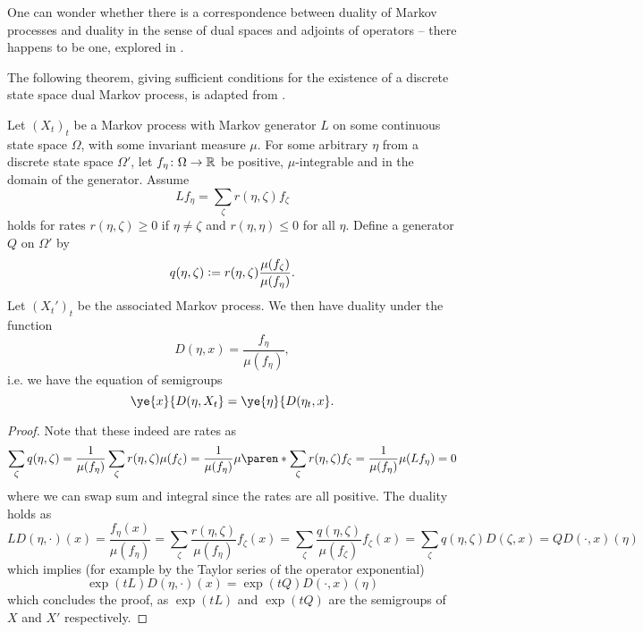 \documentclass{article}
\begin{document}
One can wonder whether there is a correspondence between duality of Markov processes and duality in the sense of dual spaces and adjoints of operators -- there happens to be one, explored in \cite{jansen2014notion}. %


The following theorem, giving sufficient conditions for the existence of a discrete state space dual Markov process, is adapted from \cite{barbour2000transition}.

\begin{theorem}\label{barbour}
Let $(X_t)_t$ be a Markov process with Markov generator $L$ on some continuous state space $\Omega$, with some invariant measure $\mu$. For some arbitrary $\eta$ from a discrete state space $\Omega'$, let $f_{\eta} \colon \Omega \to \mathbb{R}$ be positive, $\mu$-integrable and in the domain of the generator. Assume
\[
L f_{\eta} = \sum_{\zeta} r(\eta, \zeta) f_{\zeta}
\]
holds for rates $r(\eta, \zeta) \ge 0$ if $\eta \ne \zeta$ and $r(\eta, \eta) \le 0$ for all $\eta$. Define a generator $Q$ on $\Omega'$ by
\[
q(\eta, \zeta)
\vcentcolon= r(\eta, \zeta) \frac{\mu(f_{\zeta})}{\mu(f_{\eta})}.
\]
Let $(X_t')_t$ be the associated Markov process. We then have duality under the function
\[
D(\eta, x) = \frac{f_{\eta}}{\mu(f_{\eta})},
\]
i.e. we have the equation of semigroups
\[
\ye{x}{D(\eta, X_t}
= \ye{\eta}{D(\eta_t, x}.
\]
\end{theorem}
\begin{proof}
Note that these indeed are rates as
\[
\sum_{\zeta} q(\eta, \zeta)
= \frac{1}{\mu(f_{\eta})} \sum_{\zeta} r(\eta, \zeta)\mu(f_{\zeta})
= \frac{1}{\mu(f_{\eta})} \mu\paren*{\sum_{\zeta} r(\eta, \zeta) f_{\zeta}}
= \frac{1}{\mu(f_{\eta})} \mu(L f_{\eta})
= 0
\]
where we can swap sum and integral since the rates are all positive. The duality holds as
\[
L D(\eta, \cdot)(x)
= \frac{f_{\eta}(x)}{\mu(f_{\eta})}
= \sum_{\zeta} \frac{r(\eta, \zeta)}{\mu(f_{\eta})} f_{\zeta}(x)
= \sum_{\zeta} \frac{q(\eta, \zeta)}{\mu(f_{\zeta})} f_{\zeta}(x)
= \sum_{\zeta} q(\eta, \zeta) D(\zeta, x)
= Q D(\cdot, x)(\eta)
\]
which implies (for example by the Taylor series of the operator exponential)
\[
\exp(t L) D(\eta, \cdot)(x) = \exp(t Q) D(\cdot, x)(\eta)
\]
which concludes the proof, as $\exp(tL)$ and $\exp(tQ)$ are the semigroups of $X$ and $X'$ respectively.

\end{proof}
\end{document}
